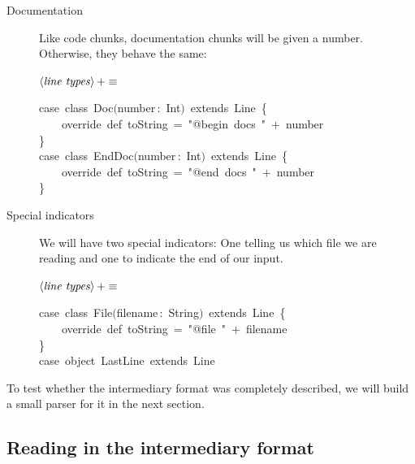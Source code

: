 \documentclass[a4paper,12pt]{article}
\begin{document}
\begin{description}
\item[Documentation] Like code chunks, documentation chunks will be given
a number. Otherwise, they behave the same:

$\left<\mbox{\emph{line types}}\right>+\equiv$
\begin{program}{\vem case}~{\vem class}~Doc$($number\,{\rm :}~Int$)$~{\vem extends}~Line~{\small\{}
\\~~~~{\vem override}~{\vem def}~toString~=~"@begin~docs~"~$+$~number
\\{\small\}}
\\{\vem case}~{\vem class}~EndDoc$($number\,{\rm :}~Int$)$~{\vem extends}~Line~{\small\{}
\\~~~~{\vem override}~{\vem def}~toString~=~"@end~docs~"~$+$~number
\\{\small\}}
\\[0.5em]\end{program}



\item[Special indicators] We will have two special indicators: One telling us
which file we are reading and one to indicate the end of our input.

$\left<\mbox{\emph{line types}}\right>+\equiv$
\begin{program}{\vem case}~{\vem class}~File$($filename\,{\rm :}~String$)$~{\vem extends}~Line~{\small\{}
\\~~~~{\vem override}~{\vem def}~toString~=~"@file~"~$+$~filename
\\{\small\}}
\\{\vem case}~{\vem object}~LastLine~{\vem extends}~Line
\\[0.5em]\end{program}



\end{description}

To test whether the intermediary format was completely described, we
will build a small parser for it in the next section.

\subsection{Reading in the intermediary format}
\end{document}
